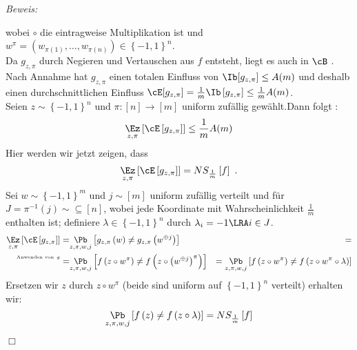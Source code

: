 \documentclass{article}
\newenvironment{proof}{
	\textit{Beweis: \\}
}{
	\begin{flushright}
		$\Box$ 
	\end{flushright}
}
\begin{document}
\begin{thm}
\begin{proof}
		 wobei $ \circ $ die eintragweise Multiplikation ist und $w^\pi = \left(w_{\pi(1)}, \dots, w_{\pi(n)} \right) \in \left\lbrace -1, 1 \right\rbrace^n $.\\
		 Da $g_{z,\pi}$ durch Negieren und Vertauschen aus $f$ entsteht, liegt es auch in $ \cB$ .\\
		 Nach Annahme hat  $g_{z,\pi}$ einen totalen Einfluss von $\Ib [g_{z,\pi}] \le A(m)$ und deshalb einen durchschnittlichen Einfluss $\cE [g_{z,\pi}] =\frac{1}{m}\Ib \left[g_{z,\pi} \right]\le \frac{1}{m}A(m)$. \\
		 Seien $z \sim \left\lbrace -1, 1 \right\rbrace^n $ und $\pi: [n] \to [m]$ uniform zuf\"allig gew\"ahlt.Dann folgt :
		 \[
			 \underset{{z, \pi} }{\Ez} \left[\cE \left[g_{z,\pi}\right]\right] \le \frac{1}{m} A(m)
		 \]
		 Hier werden wir jetzt zeigen, dass 
		 \[
			 \underset{{z, \pi} }{\Ez} \left[\cE \left[g_{z,\pi}\right]\right]=NS_{\frac{1}{m}}\left[f\right] \ .
		 \]
		 Sei $w \sim \left\lbrace -1,1 \right\rbrace^m$ und $j \sim \left[ m \right] $ uniform zuf\"allig verteilt und f\"ur $J= \pi^{-1}(j) \sim \subseteq [n]$, wobei jede Koordinate mit Wahrscheinlichkeit $\frac{1}{m}$ enthalten ist; definiere $\lambda \in \left\lbrace -1 ,1 \right\rbrace^n$ durch $\lambda_i=-1 \LRA i \in J $.\\
		 \begin{eqnarray*}
			 \underset{{z, \pi} }{\Ez} \left[ \cE \left[ g_{z,\pi } \right]\right] =& \underset{{z,\pi,w,j}}{\Pb} \left[  g_{z,\pi }\left(w\right) \neq g_{z,\pi }\left(w^{\oplus j }\right) \right] &= \\
			 ^{\overset{\text{Anwenden von} \ g}{}}=& \underset{{z,\pi,w,j}}{\Pb} \left[ f \left( z \circ w^\pi \right) \neq f \left( z \circ \left( w^{\oplus j}\right)^\pi \right)\right] &= \underset{{z,\pi,w,j}}{\Pb} \left[ f \left( z \circ w^\pi \right) \neq f \left( z \circ  w^\pi \circ \lambda \right) \right]
		 \end{eqnarray*}
		 Ersetzen wir $z$ durch $z \circ w^\pi $ (beide sind uniform auf $\left\lbrace -1,1 \right\rbrace^n$ verteilt) erhalten wir:
		 \[
		  \underset{{z,\pi,w,j}}{\Pb} \left[ f \left( z \right) \neq f \left( z  \circ \lambda \right) \right]=NS_{\frac{1}{m}}\left[f\right]
		 \]
	 \end{proof}
	 	 \end{thm}
\end{document}
